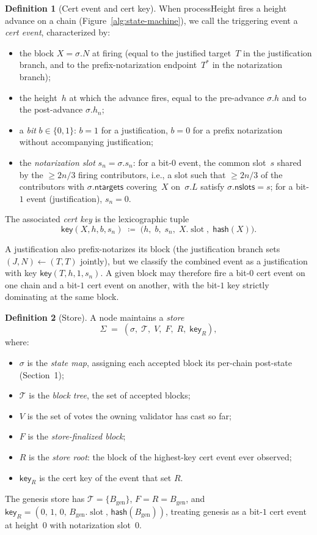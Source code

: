 \documentclass{article}
\newcommand{\genesis}{\ensuremath{B_{\mathrm{gen}}}}
\newcommand{\T}[0]{\ensuremath{\mathcal{T}}}
\newcommand{\slot}[0]{\ensuremath{\operatorname{\mathrm{slot}}}}
\newcommand{\ntargets}{\mathsf{ntargets}}
\newcommand{\nslots}{\mathsf{nslots}}
\newcommand{\hash}{\mathsf{hash}}
\newcommand{\key}{\mathsf{key}}
\newcommand{\processHeight}{\textsf{processHeight}\xspace}
\theoremstyle{plain}
\theoremstyle{definition}
\newtheorem{definition}{Definition}
\theoremstyle{remark}
\begin{document}
\begin{definition}[Cert event and cert key]\label{def:cert-event}
When \processHeight fires a height advance on a chain (Figure~\ref{alg:state-machine}), we call the triggering event a \emph{cert event}, characterized by:
\begin{itemize}
  \item the block $X = \sigma.N$ at firing (equal to the justified target~$T$ in the justification branch, and to the prefix-notarization endpoint~$T^*$ in the notarization branch);
  \item the height~$h$ at which the advance fires, equal to the pre-advance $\sigma.h$ and to the post-advance $\sigma.h_n$;
  \item a \emph{bit} $b \in \{0, 1\}$: $b = 1$ for a justification, $b = 0$ for a prefix notarization without accompanying justification;
  \item the \emph{notarization slot} $s_n = \sigma.s_n$: for a bit-$0$ event, the common slot~$s$ shared by the $\geq 2n/3$ firing contributors, i.e., a slot such that $\geq 2n/3$ of the contributors with $\sigma.\ntargets$ covering~$X$ on~$\sigma.L$ satisfy $\sigma.\nslots = s$; for a bit-$1$ event (justification), $s_n = 0$.
\end{itemize}
The associated \emph{cert key} is the lexicographic tuple
\[
  \key(X, h, b, s_n) \;\coloneqq\; \bigl(h,\; b,\; s_n,\; X.\slot,\; \hash(X)\bigr).
\]
\end{definition}

A justification also prefix-notarizes its block (the justification branch sets $(J, N) \gets (T, T)$ jointly), but we classify the combined event as a justification with key $\key(T, h, 1, s_n)$.
A given block may therefore fire a bit-$0$ cert event on one chain and a bit-$1$ cert event on another, with the bit-$1$ key strictly dominating at the same block.

\begin{definition}[Store]\label{def:store}
A node maintains a \emph{store}
\[
  \Sigma \;=\; (\sigma,\; \T,\; V,\; F,\; R,\; \key_R),
\]
where:
\begin{itemize}
  \item $\sigma$ is the \emph{state map}, assigning each accepted block its per-chain post-state (Section~1);
  \item $\T$ is the \emph{block tree}, the set of accepted blocks;
  \item $V$ is the set of votes the owning validator has cast so far;
  \item $F$ is the \emph{store-finalized block};
  \item $R$ is the \emph{store root}: the block of the highest-key cert event ever observed;
  \item $\key_R$ is the cert key of the event that set $R$.
\end{itemize}
The genesis store has $\T = \{\genesis\}$, $F = R = \genesis$, and $\key_R = (0,\, 1,\, 0,\, \genesis.\slot,\, \hash(\genesis))$, treating genesis as a bit-$1$ cert event at height~$0$ with notarization slot~$0$.
\end{definition}
\end{document}
